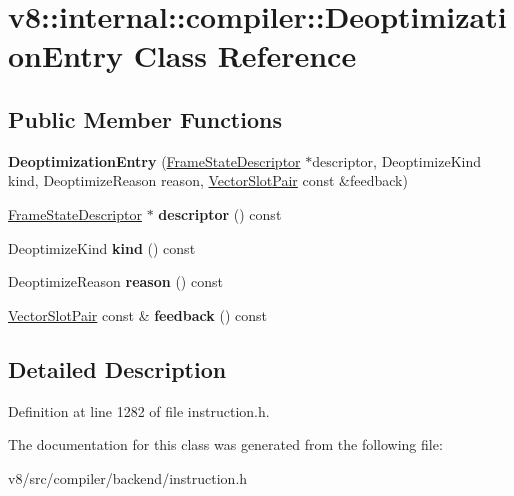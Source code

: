 \hypertarget{classv8_1_1internal_1_1compiler_1_1DeoptimizationEntry}{}\section{v8\+:\+:internal\+:\+:compiler\+:\+:Deoptimization\+Entry Class Reference}
\label{classv8_1_1internal_1_1compiler_1_1DeoptimizationEntry}
\subsection*{Public Member Functions}
\begin{DoxyCompactItemize}
\item 
\mbox{\label{classv8_1_1internal_1_1compiler_1_1DeoptimizationEntry_ab57f53946753e11b5145803738f9e30a}} 
{\bfseries Deoptimization\+Entry} (\mbox{\hyperlink{classv8_1_1internal_1_1compiler_1_1FrameStateDescriptor}{Frame\+State\+Descriptor}} $\ast$descriptor, Deoptimize\+Kind kind, Deoptimize\+Reason reason, \mbox{\hyperlink{classv8_1_1internal_1_1VectorSlotPair}{Vector\+Slot\+Pair}} const \&feedback)
\item 
\mbox{\label{classv8_1_1internal_1_1compiler_1_1DeoptimizationEntry_a3602252ecd1122486d0ceeb9e760309b}} 
\mbox{\hyperlink{classv8_1_1internal_1_1compiler_1_1FrameStateDescriptor}{Frame\+State\+Descriptor}} $\ast$ {\bfseries descriptor} () const
\item 
\mbox{\label{classv8_1_1internal_1_1compiler_1_1DeoptimizationEntry_afd3fbef05e218796ec365f5bb56f6a7e}} 
Deoptimize\+Kind {\bfseries kind} () const
\item 
\mbox{\label{classv8_1_1internal_1_1compiler_1_1DeoptimizationEntry_a37887bdcb50560e108dc1ab018b8746f}} 
Deoptimize\+Reason {\bfseries reason} () const
\item 
\mbox{\label{classv8_1_1internal_1_1compiler_1_1DeoptimizationEntry_a29d33589033969693c5799929d4ffc38}} 
\mbox{\hyperlink{classv8_1_1internal_1_1VectorSlotPair}{Vector\+Slot\+Pair}} const  \& {\bfseries feedback} () const
\end{DoxyCompactItemize}


\subsection{Detailed Description}


Definition at line 1282 of file instruction.\+h.



The documentation for this class was generated from the following file\+:\begin{DoxyCompactItemize}
\item 
v8/src/compiler/backend/instruction.\+h\end{DoxyCompactItemize}
